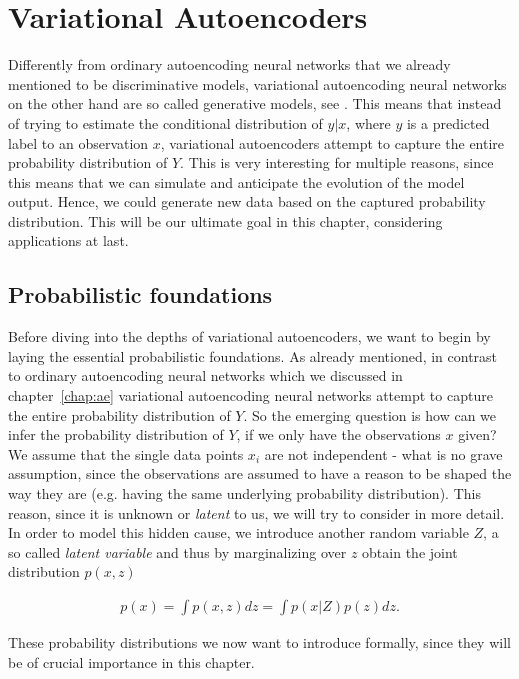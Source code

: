\chapter{Variational Autoencoders}\label{chap:vae}

Differently from ordinary autoencoding neural networks that we already mentioned to be discriminative models, variational autoencoding neural networks on the other hand are so called generative models, see \cite[chapter~5]{cinelli2021variational}. This means that instead of trying to estimate the conditional distribution of $y|x$, where $y$ is a predicted label to an observation $x$, variational autoencoders attempt to capture the entire probability distribution of $Y$. This is very interesting for multiple reasons, since this means that we can simulate and anticipate the evolution of the model output. Hence, we could generate new data based on the captured probability distribution. This will be our ultimate goal in this chapter, considering applications at last.

\section{Probabilistic foundations}

Before diving into the depths of variational autoencoders, we want to begin by laying the essential probabilistic foundations. As already mentioned, in contrast to ordinary autoencoding neural networks which we discussed in chapter~\ref{chap:ae}
variational autoencoding neural networks attempt to capture the entire probability distribution of $Y$. So the emerging question is how can we infer the probability distribution of $Y$, if we only have the observations $x$ given? We assume that the single data points $x_i$ are not independent - what is no grave assumption, since the observations are assumed to have a reason to be shaped the way they are (e.g. having the same underlying probability distribution). This reason, since it is unknown or \textit{latent} to us, we will try to consider in more detail. In order to model this hidden cause, we introduce another random variable $Z$, a so called \textit{latent variable} and thus by marginalizing over $z$ obtain the joint distribution $p(x,z)$

\begin{align}\label{eq:evidence}
p(x) = \int p(x,z) dz = \int p(x|Z)p(z)dz.
\end{align}

These probability distributions we now want to introduce formally, since they will be of crucial importance in this chapter.

